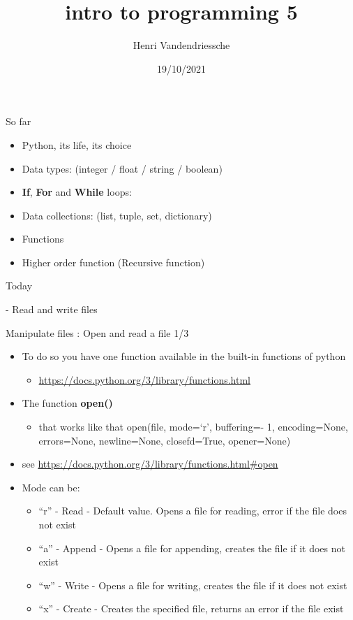 \documentclass[
  8pt,
  ignorenonframetext,
]{beamer}
\title{intro to programming 5}
\author{Henri Vandendriessche}
\date{19/10/2021}
\providecommand{\tightlist}{%
  \setlength{\itemsep}{0pt}\setlength{\parskip}{0pt}}
\begin{document}
\frame{\titlepage}

\begin{frame}{So far}
\protect\hypertarget{so-far}{}
\begin{itemize}
\item
  Python, its life, its choice
\item
  Data types: (integer / float / string / boolean)
\item
  \textbf{If}, \textbf{For} and \textbf{While} loops:
\item
  Data collections: (list, tuple, set, dictionary)
\item
  Functions
\item
  Higher order function (Recursive function)
\end{itemize}
\end{frame}

\begin{frame}{Today}
\protect\hypertarget{today}{}
\begin{block}{- Read and write files}
\protect\hypertarget{read-and-write-files}{}
\end{block}
\end{frame}

\begin{frame}{Manipulate files : Open and read a file 1/3}
\protect\hypertarget{manipulate-files-open-and-read-a-file-13}{}
\begin{itemize}
\item
  To do so you have one function available in the built-in functions of
  python

  \begin{itemize}
  \tightlist
  \item
    \url{https://docs.python.org/3/library/functions.html}
  \end{itemize}
\item
  The function \textbf{open()}

  \begin{itemize}
  \tightlist
  \item
    that works like that open(file, mode=`r', buffering=- 1,
    encoding=None, errors=None, newline=None, closefd=True, opener=None)
  \end{itemize}
\item
  see \url{https://docs.python.org/3/library/functions.html\#open}
\item
  Mode can be:

  \begin{itemize}
  \tightlist
  \item
    ``r'' - Read - Default value. Opens a file for reading, error if the
    file does not exist
  \item
    ``a'' - Append - Opens a file for appending, creates the file if it
    does not exist
  \item
    ``w'' - Write - Opens a file for writing, creates the file if it
    does not exist
  \item
    ``x'' - Create - Creates the specified file, returns an error if the
    file exist
  \end{itemize}
\end{itemize}
\end{frame}
\end{document}
